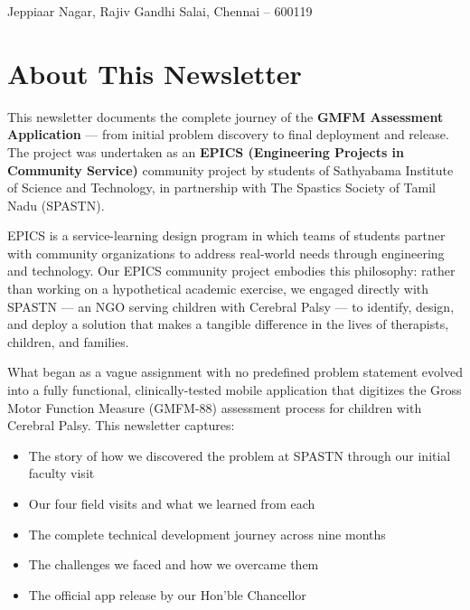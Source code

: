 \documentclass[11pt,a4paper]{article}
\begin{document}
\vspace*{\fill}

\begin{center}
    {\small\color{white} Jeppiaar Nagar, Rajiv Gandhi Salai, Chennai -- 600119}
\end{center}

\newpage


\tableofcontents
\newpage

\section{About This Newsletter}

This newsletter documents the complete journey of the \textbf{GMFM Assessment Application} --- from initial problem discovery to final deployment and release. The project was undertaken as an \textbf{EPICS (Engineering Projects in Community Service)} community project by students of Sathyabama Institute of Science and Technology, in partnership with The Spastics Society of Tamil Nadu (SPASTN).

EPICS is a service-learning design program in which teams of students partner with community organizations to address real-world needs through engineering and technology. Our EPICS community project embodies this philosophy: rather than working on a hypothetical academic exercise, we engaged directly with SPASTN --- an NGO serving children with Cerebral Palsy --- to identify, design, and deploy a solution that makes a tangible difference in the lives of therapists, children, and families.

What began as a vague assignment with no predefined problem statement evolved into a fully functional, clinically-tested mobile application that digitizes the Gross Motor Function Measure (GMFM-88) assessment process for children with Cerebral Palsy. This newsletter captures:

\begin{itemize}[leftmargin=2em]
    \item The story of how we discovered the problem at SPASTN through our initial faculty visit
    \item Our four field visits and what we learned from each
    \item The complete technical development journey across nine months
    \item The challenges we faced and how we overcame them
    \item The official app release by our Hon'ble Chancellor
\end{itemize}
\end{document}
